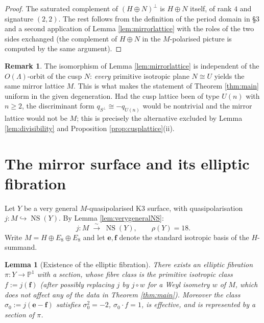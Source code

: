 \documentclass[11pt]{amsart}
\theoremstyle{plain}
\newtheorem{lemma}[theorem]{Lemma}
\theoremstyle{definition}
\newtheorem{remark}[theorem]{Remark}
\newcommand{\Pn}{\mathbb{P}^1}
\newcommand{\NS}{\operatorname{NS}}
\newcommand{\Lam}{\Lambda}
\newcommand{\e}{\mathbf{e}}
\newcommand{\ff}{\mathbf{f}}
\begin{document}
\begin{proof}
The saturated complement of $(H\oplus N)^\perp$ is $H\oplus N$ itself, of rank
$4$ and signature $(2,2)$. The rest follows from the definition of the period
domain in \S 3 and a second application of Lemma \ref{lem:mirrorlattice} with
the roles of the two sides exchanged (the complement of $H\oplus N$ in the
$M$-polarised picture is computed by the same argument).
\end{proof}

\begin{remark}
The isomorphism of Lemma \ref{lem:mirrorlattice} is independent of the
$O(\Lam)$-orbit of the cusp $N$: \emph{every} primitive isotropic plane
$N\cong U$ yields the same mirror lattice $M$. This is what makes the statement
of Theorem \ref{thm:main} uniform in the given degeneration. Had the cusp
lattice been of type $U(n)$ with $n\ge 2$, the discriminant form
$q_{S^\perp}\cong -q_{U(n)}$ would be nontrivial and the mirror lattice would
not be $M$; this is precisely the alternative excluded by Lemma
\ref{lem:divisibility} and Proposition \ref{prop:cusplattice}(ii).
\end{remark}

\section{The mirror surface and its elliptic fibration}\label{sec:fibration}

Let $Y$ be a very general $M$-quasipolarised K3 surface, with quasipolarisation
$j\colon M\hookrightarrow\NS(Y)$. By Lemma \ref{lem:verygeneralNS}:
\begin{equation}\label{eq:NSisM}
j\colon M\;\stackrel{\sim}{\longrightarrow}\;\NS(Y),\qquad \rho(Y)=18.
\end{equation}
Write $M=H\oplus E_8\oplus E_8$ and let $\e,\ff$ denote the standard isotropic
basis of the $H$-summand.

\begin{lemma}[Existence of the elliptic fibration]\label{lem:fibrationexists}
There exists an elliptic fibration $\pi\colon Y\to\Pn$ with a section, whose
fibre class is the primitive isotropic class $f:=j(\ff)$ (after possibly
replacing $j$ by $j\circ w$ for a Weyl isometry $w$ of $M$, which does not
affect any of the data in Theorem \ref{thm:main}). Moreover the class
$\sigma_0:=j(\e-\ff)$ satisfies $\sigma_0^2=-2$, $\sigma_0\cdot f=1$, is
effective, and is represented by a section of $\pi$.
\end{lemma}
\end{document}
